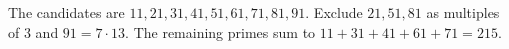 The candidates are $11,21,31,41,51,61,71,81,91$. Exclude $21,51,81$ as multiples of $3$ and $91=7\cdot13$. The remaining primes sum to $11+31+41+61+71=\boxed{215}$.
